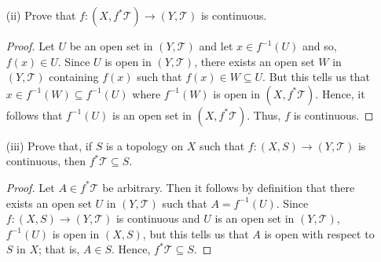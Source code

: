 \documentclass[a4paper]{article}
\begin{document}
\begin{problem}
\begin{enumerate}
\begin{proof}
            (iii) Let \( \{ {A}_{\alpha}  \}_{\alpha \in \Omega}\) be a collection of sets in \( f^{*} \mathcal{T} \). Then for all \( \alpha \in \Omega \), \( {A}_{\alpha} = f^{-1}({U}_{\alpha}) \) for some \( {U}_{\alpha} \in \mathcal{T} \). Then
            \[  \bigcup_{ \alpha \in \Omega  }^{  }  {A}_{\alpha} = \bigcup_{ \alpha \in \Omega  }^{  }  f^{-1} ({U}_{\alpha}) = f^{-1} \Big( \bigcup_{  \alpha \in \Omega }^{  }  {U}_{\alpha} \Big). \]
            Since \( \{ {U}_{\alpha} \}_{\alpha \in \Omega} \subseteq \mathcal{T} \) and \( \mathcal{T} \) is a topology, it follows that \( \bigcup_{ \alpha \in \Omega }^{  } {U}_{\alpha} \in \mathcal{T} \). This tells us that  
            \[  \bigcup_{ \alpha \in \Omega }^{  } {A}_{\alpha} \in f^{*} \mathcal{T}. \]
            Thus, from (i) through (iii), we conclude that \( f^{*} \mathcal{T} \) is, indeed, a topology on \( X  \).
            \end{proof}
        \item[(ii)] Prove that \( f: (X, f^{*} \mathcal{T}) \to (Y, \mathcal{T}) \) is continuous.
            \begin{proof}
            Let \( U  \) be an open set in \( (Y,\mathcal{T}) \) and let \( x \in f^{-1}(U) \) and so, \( f(x) \in U \). Since \( U \) is open in \( (Y, \mathcal{T})\), there exists an open set \( W  \) in \( (Y, \mathcal{T}) \) containing \( f(x)  \) such that \( f(x) \in W \subseteq U  \). But this tells us that \( x \in f^{-1}(W) \subseteq f^{-1}(U) \) where \( f^{-1}(W) \) is open in \( (X,f^{*}\mathcal{T}) \). Hence, it follows that \( f^{-1}(U) \) is an open set in \( (X, f^{*}\mathcal{T}) \). Thus, \( f  \) is continuous.
            \end{proof}
        \item[(iii)] Prove that, if \( S  \) is a topology on \( X  \) such that \( f: (X,S) \to (Y,\mathcal{T}) \) is continuous, then \( f^{*} \mathcal{T} \subseteq S \).
            \begin{proof}
            Let \( A \in f^{*} \mathcal{T}   \) be arbitrary. Then it follows by definition that there exists an open set \( U \) in \( (Y,\mathcal{T}) \) such that \( A = f^{-1}(U) \). Since \( f: (X,S) \to (Y,\mathcal{T}) \) is continuous and \( U \) is an open set in \( (Y, \mathcal{T}) \), \( f^{-1}(U) \) is open in \( (X,S) \), but this tells us that \( A  \) is open with respect to \( S  \) in \( X  \); that is, \( A \in S  \). Hence, \( f^{*} \mathcal{T} \subseteq S \).
            \end{proof}
    \end{enumerate}
\end{problem}
\end{document}
